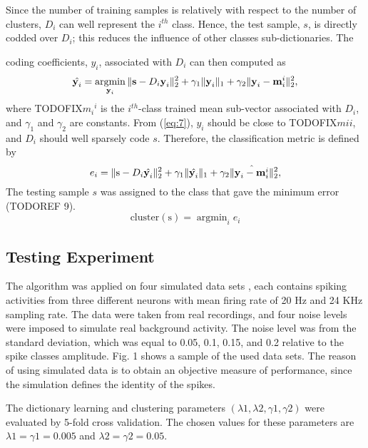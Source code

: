 \documentclass[conference]{IEEEtran}
\DeclareMathOperator*{\argmin}{argmin}
\begin{document}
	Since the number of training samples is relatively with respect to the number of clusters, $D_i$ can well represent the $i^{th}$ class. Hence, the test sample, $s$, is directly codded over $D_i$; this reduces the influence of other classes sub-dictionaries. The
	
	 
	coding coefficients, $y_i$, associated with $D_i$ can then computed as
	\begin{equation}
		\label{eq:7}
		\hat{\textbf{y}_i}=\argmin_{\textbf{y}_i}\paralleled{\textbf{s}-D_i\textbf{y}_i}_2^2+\gamma_1\paralleled{\textbf{y}_i}_1+\gamma_2\paralleled{\textbf{y}_i-\textbf{m}_i^i}_2^2,
	\end{equation}
	where TODOFIX${m_i}^i$ is the $i^{th}$-class trained mean sub-vector associated with $D_i$, and $\gamma_1$ and $\gamma_2$ are constants. From (\ref{eq:7}), $y_i$ should be close to TODOFIX$mi i$, and $D_i$ should well sparsely code $s$. Therefore, the classification metric is defined by
	\begin{equation}
		\label{eq:8}
		e_i=\Vert{\text{s}-D_i\hat{\textbf{y}_i}}\Vert_2^2+\gamma_1\Vert{\hat{\textbf{y}_i}}\Vert_1+\gamma_2\Vert{\hat{\textbf{y}_i-\textbf{m}_i^i}}\Vert_2^2,
	\end{equation}
	The testing sample $s$ was assigned to the class that gave the minimum error (TODOREF 9).
	\begin{equation}
		\label{eq:8}
		\mathrm{cluster(s)}=\argmin_ie_i
	\end{equation}
	
	\subsection{Testing Experiment}
	The algorithm was applied on four simulated data sets \cite{quiroga2004unsupervised}, each contains spiking activities from three different neurons with mean firing rate of 20 Hz and 24 KHz sampling rate. The data were taken from real recordings, and four noise levels were imposed to simulate real background activity. The noise level was from the standard deviation, which was equal to 0.05, 0.1, 0.15, and 0.2 relative to the spike classes amplitude. Fig. 1 shows a sample of the used data sets. The reason of using simulated data is to obtain an objective measure of performance, since the simulation defines the identity of the spikes.
	
	The dictionary learning and clustering parameters
	$(\lambda1, \lambda2, \gamma1, \gamma2)$ were evaluated by 5-fold cross validation. The chosen values for these parameters are $\lambda1 = \gamma1 = 0.005$ and $\lambda2 = \gamma2 = 0.05$.
	
\end{document}
